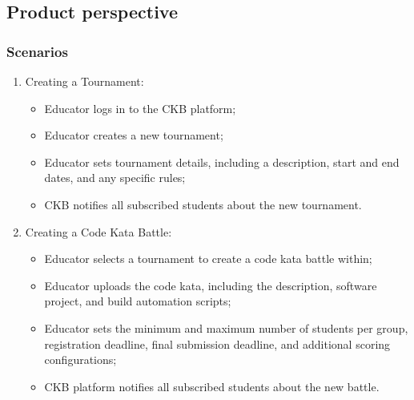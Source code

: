 \subsection{Product perspective}
\subsubsection{Scenarios}


\begin{enumerate}
   \item Creating a Tournament:
        \begin{itemize}
            \item Educator logs in to the CKB platform;
            \item Educator creates a new tournament;
            \item Educator sets tournament details, including a description, start and end dates, and any specific rules;
            \item CKB notifies all subscribed students about the new tournament.
        \end{itemize}

   \item Creating a Code Kata Battle:
        \begin{itemize}
            \item Educator selects a tournament to create a code kata battle within;
            \item Educator uploads the code kata, including the description, software project, and build automation scripts;
            \item Educator sets the minimum and maximum number of students per group, registration deadline, final submission deadline, and additional scoring configurations;
            \item CKB platform notifies all subscribed students about the new battle.
        \end{itemize}


\end{enumerate}
